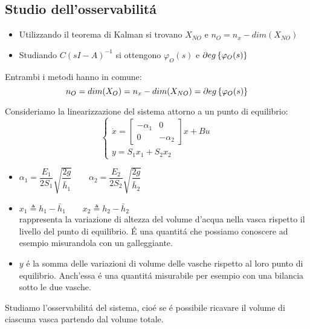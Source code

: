 \documentclass[../main.tex]{subfiles}
\begin{document}
	\subsection{Studio dell'osservabilit\'a}
		\begin{itemize}
			\item 
				Utilizzando il teorema di Kalman si trovano $ X_{NO} $ e $ n_O = n_x - dim(X_{NO}) $
			\item 
				Studiando $ C(sI-A)^{-1} $ si ottengono $ \varphi_O(s) $ e $ \partial eg \left\lbrace \varphi_O(s) \right\rbrace $
		\end{itemize}
		Entrambi i metodi hanno in comune:
		\[
			n_O = dim(X_O) = n_x - dim(X_{NO}) = \partial eg \left\lbrace \varphi_O(s) \right\rbrace
		\]
		
		\begin{mdframed}[style=Exercise]
			\begin{Exercise}[title={Studiare l'osservabilit\'a di due vasche in parallelo}]
				Consideriamo la linearizzazione del sistema attorno a un punto di equilibrio:
				\[
					\begin{cases}
						\dot x=
						\begin{bmatrix}
							-\alpha_1 & 0\\
							0 & -\alpha_2
						\end{bmatrix} x + Bu	
						\\
						y = S_1 x_1 + S_2 x_2
					\end{cases}
				\]
				\begin{itemize}
					\item 
						$ \alpha_1 = \dfrac{E_1}{2S_1} \sqrt{\dfrac{2g}{\overset{}{\bar h_1}}} \qquad \alpha_2 = \dfrac{E_2}{2S_2} \sqrt{\dfrac{2g}{\overset{}{\bar h_2}}} $ 
					\item 
						$ x_1 \triangleq h_1 - \bar h_1 \qquad x_2 \triangleq h_2 - \bar h_2 $\\
						rappresenta la variazione di altezza del volume d'acqua nella vasca rispetto il livello del punto di equilibrio. \'E una quantit\'a che possiamo conoscere ad esempio misurandola con un galleggiante.
					\item 
						$ y $ \'e la somma delle variazioni di volume delle vasche rispetto al loro punto di equilibrio. Anch'essa \'e una quantit\'a misurabile per esempio con una bilancia sotto le due vasche. 
				\end{itemize}
			
				Studiamo l'osservabilit\'a del sistema, cio\'e se \'e possibile ricavare il volume di ciascuna vasca partendo dal volume totale.
				

\end{Exercise}
\end{mdframed}
\end{document}
